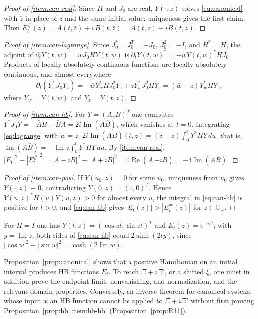 \documentclass[11pt]{amsart}
\theoremstyle{plain}
\theoremstyle{definition}
\theoremstyle{remark}
\numberwithin{equation}{section}
\newcommand{\Cp}{\mathbb{C}_{+}}
\DeclareMathOperator{\Ima}{Im}
\DeclareMathOperator{\Rea}{Re}
\renewcommand{\Re}{\Rea}
\renewcommand{\Im}{\Ima}
\begin{document}
\begin{proof}[Proof of \ref{item:can-real}]
Since $H$ and $J_0$ are real, $\overline{Y(\cdot,z)}$ solves
\eqref{eq:canonical} with $\bar z$ in place of $z$ and the same initial
value; uniqueness gives the first claim. Then
$E_t^\#(z)=\overline{A(t,\bar z)}+i\,\overline{B(t,\bar z)}
=A(t,z)+iB(t,z)$.
\end{proof}

\begin{proof}[Proof of \ref{item:can-lagrange}]
Since $J_0^*=J_0^T=-J_0$, $J_0^2=-I$, and $H^*=H$, the adjoint of
$\partial_tY(t,w)=wJ_0HY(t,w)$ is
$\partial_tY(t,w)^*=-\bar wY(t,w)^*HJ_0$. Products of locally
absolutely continuous functions are locally absolutely continuous, and
almost everywhere
\[
\partial_t(Y_w^*J_0Y_z)=-\bar wY_w^*HJ_0^2Y_z+zY_w^*J_0^2HY_z
=(\bar w-z)Y_w^*HY_z,
\]
where $Y_w=Y(t,w)$ and $Y_z=Y(t,z)$.
\end{proof}

\begin{proof}[Proof of \ref{item:can-hb}]
For $Y=(A,B)^T$ one computes $Y^*J_0Y=-\bar AB+\bar BA=2i\Im(A\bar B)$,
which vanishes at $t=0$. Integrating \eqref{eq:lagrange} with $w=z$,
$2i\Im(A\bar B)(t,z)=(\bar z-z)\int_0^tY^*HY\,du$, that is,
$\Im(A\bar B)=-\Im z\int_0^tY^*HY\,du$. By \ref{item:can-real},
$|E_t|^2-|E_t^\#|^2=|A-iB|^2-|A+iB|^2=4\Re(A\,\overline{-iB})
=-4\Im(A\bar B)$.
\end{proof}

\begin{proof}[Proof of \ref{item:can-pos}]
If $Y(u_0,z)=0$ for some $u_0$, uniqueness from $u_0$ gives
$Y(\cdot,z)\equiv0$, contradicting $Y(0,z)=(1,0)^T$. Hence
$Y(u,z)^*H(u)Y(u,z)>0$ for almost every $u$, the integral in
\eqref{eq:can-hb} is positive for $t>0$, and \eqref{eq:can-hb} gives
$|E_t(z)|>|E_t^\#(z)|$ for $z\in\Cp$.
\end{proof}

For $H=I$ one has $Y(t,z)=(\cos zt,\sin zt)^T$ and $E_t(z)=e^{-izt}$;
with $y=\Im z$, both sides of \eqref{eq:can-hb} equal
$2\sinh(2ty)$, since $|\cos w|^2+|\sin w|^2=\cosh(2\Im w)$.

Proposition~\ref{prop:canonical} shows that a positive Hamiltonian on
an initial interval produces HB functions $E_t$. To reach
$\Xi+i\Xi'$, or a shifted $\xi$, one must in addition prove the
endpoint limit, nonvanishing, and normalization, and the relevant domain
properties. Conversely, an inverse theorem for canonical systems whose
input is an HB function cannot be applied to $\Xi+i\Xi'$ without first
proving Proposition~\ref{prop:hb}\ref{item:hb-hb}
(Proposition~\ref{prop:R11}).
\end{document}

